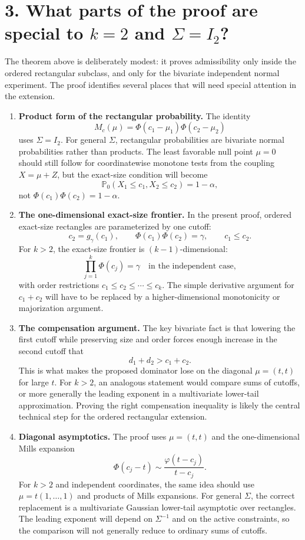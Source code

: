 \documentclass[12pt]{article}
\theoremstyle{definition}
\theoremstyle{remark}
\newcommand{\Prob}{\mathbb P}
\newcommand{\phidens}{\varphi}
\newcommand{\gammalev}{\gamma}
\begin{document}
\section*{3. What parts of the proof are special to $k=2$ and $\Sigma=I_2$?}

The theorem above is deliberately modest: it proves admissibility only inside the ordered rectangular subclass, and only for the bivariate independent normal experiment. The proof identifies several places that will need special attention in the extension.

\begin{enumerate}[label=\textbf{(E\arabic*)},leftmargin=2.4em]
\item \textbf{Product form of the rectangular probability.}
The identity
\[
M_c(\mu)=\Phi(c_1-\mu_1)\Phi(c_2-\mu_2)
\]
uses $\Sigma=I_2$. For general $\Sigma$, rectangular probabilities are bivariate normal probabilities rather than products. The least favorable null point $\mu=0$ should still follow for coordinatewise monotone tests from the coupling $X=\mu+Z$, but the exact-size condition will become
\[
\Prob_0(X_1\le c_1,X_2\le c_2)=1-\alpha,
\]
not $\Phi(c_1)\Phi(c_2)=1-\alpha$.

\item \textbf{The one-dimensional exact-size frontier.}
In the present proof, ordered exact-size rectangles are parameterized by one cutoff:
\[
c_2=g_\gammalev(c_1),
\qquad
\Phi(c_1)\Phi(c_2)=\gammalev,
\qquad
c_1\le c_2.
\]
For $k>2$, the exact-size frontier is $(k-1)$-dimensional:
\[
\prod_{j=1}^k \Phi(c_j)=\gammalev
\quad\text{in the independent case},
\]
with order restrictions $c_1\le c_2\le\cdots\le c_k$. The simple derivative argument for $c_1+c_2$ will have to be replaced by a higher-dimensional monotonicity or majorization argument.

\item \textbf{The compensation argument.}
The key bivariate fact is that lowering the first cutoff while preserving size and order forces enough increase in the second cutoff that
\[
d_1+d_2>c_1+c_2.
\]
This is what makes the proposed dominator lose on the diagonal $\mu=(t,t)$ for large $t$. For $k>2$, an analogous statement would compare sums of cutoffs, or more generally the leading exponent in a multivariate lower-tail approximation. Proving the right compensation inequality is likely the central technical step for the ordered rectangular extension.

\item \textbf{Diagonal asymptotics.}
The proof uses $\mu=(t,t)$ and the one-dimensional Mills expansion
\[
\Phi(c_j-t)\sim \frac{\phidens(t-c_j)}{t-c_j}.
\]
For $k>2$ and independent coordinates, the same idea should use $\mu=t(1,\ldots,1)$ and products of Mills expansions. For general $\Sigma$, the correct replacement is a multivariate Gaussian lower-tail asymptotic over rectangles. The leading exponent will depend on $\Sigma^{-1}$ and on the active constraints, so the comparison will not generally reduce to ordinary sums of cutoffs.


\end{enumerate}
\end{document}
